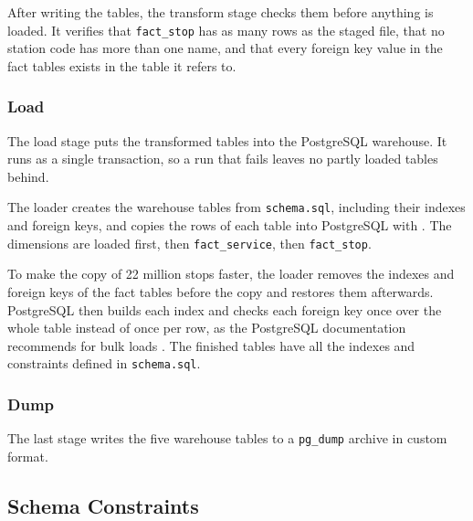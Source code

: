 After writing the tables, the transform stage checks them before anything is loaded. It verifies that \texttt{fact\_stop} has as many rows as the staged file, that no station code has more than one name, and that every foreign key value in the fact tables exists in the table it refers to.

\subsubsection{Load}
\label{subsubsec:loading}

The load stage puts the transformed tables into the PostgreSQL warehouse. It runs as a single transaction, so a run that fails leaves no partly loaded tables behind.

The loader creates the warehouse tables from \texttt{schema.sql}, including their indexes and foreign keys, and copies the rows of each table into PostgreSQL with . The dimensions are loaded first, then \texttt{fact\_service}, then \texttt{fact\_stop}.

To make the copy of 22 million stops faster, the loader removes the indexes and foreign keys of the fact tables before the copy and restores them afterwards. PostgreSQL then builds each index and checks each foreign key once over the whole table instead of once per row, as the PostgreSQL documentation recommends for bulk loads \cite{postgresql2025populating}. The finished tables have all the indexes and constraints defined in \texttt{schema.sql}.

\subsubsection{Dump}
\label{subsubsec:dump}

The last stage writes the five warehouse tables to a \texttt{pg\_dump} archive in custom format.

\subsection{Schema Constraints}
\label{subsec:schema_constraints}

